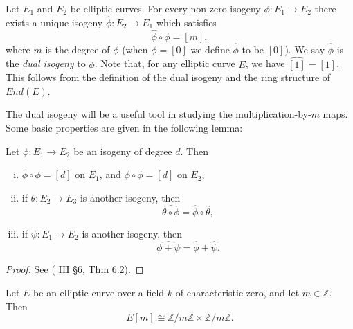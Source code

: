 Let $E_{1}$ and $E_{2}$ be elliptic curves.  For every non-zero isogeny $\phi \colon
E_{1} \rightarrow E_{2}$ there exists a unique isogeny $\hat{\phi} \colon E_{2}
\rightarrow E_{1}$ which satisfies
\begin{equation}
  \label{eq:dual-isogeny}
  \hat{\phi} \circ \phi = \left[ m \right],
\end{equation}
where $m$ is the degree of $\phi$ (when $\phi = \left[ 0 \right]$ we define
$\hat{\phi}$ to be $\left[ 0 \right]$).  We say $\hat{\phi}$ is the \emph{dual
  isogeny} to $\phi$.  Note that, for any elliptic curve $E$, we have $\widehat{[1]}
= [1]$.  This follows from the definition of the dual isogeny and the ring structure
of $End(E)$.

The dual isogeny will be a useful tool in studying the multiplication-by-$m$ maps.
Some basic properties are given in the following lemma:
\begin{lem}
  \label{lem:properties-of-dual-isogenies}
  Let $\phi \colon E_{1} \rightarrow E_{2}$ be an isogeny of degree $d$.  Then
  \begin{enumerate}[(i)]
  \item $\bar{\phi} \circ \phi = \left[ d \right]$ on $E_{1}$, and $\phi \circ
    \bar{\phi} = \left[ d \right]$ on $E_{2}$,
  \item if $\theta \colon E_{2} \rightarrow E_{3}$ is another isogeny, then
    \begin{equation*}
      \widehat{\theta \circ \phi} = \hat{\phi} \circ \hat{\theta},
    \end{equation*}
  \item if $\psi \colon E_{1} \rightarrow E_{2}$ is another isogeny, then
    \begin{equation*}
      \widehat{\phi + \psi} = \hat{\phi} + \hat{\psi}.
    \end{equation*}
  \end{enumerate}
\end{lem}
\begin{proof}
  See (\cite{silverman86} III \S 6, Thm 6.2).
\end{proof}

\begin{prop}
  \label{prop:structure-of-E[m]}
  Let $E$ be an elliptic curve over a field $k$ of characteristic zero, and let $m
  \in \mathbb{Z}$.  Then
  \begin{equation*}
    E[m] \cong \mathbb{Z} / m \mathbb{Z} \times \mathbb{Z} / m \mathbb{Z}.
  \end{equation*}
\end{prop}

